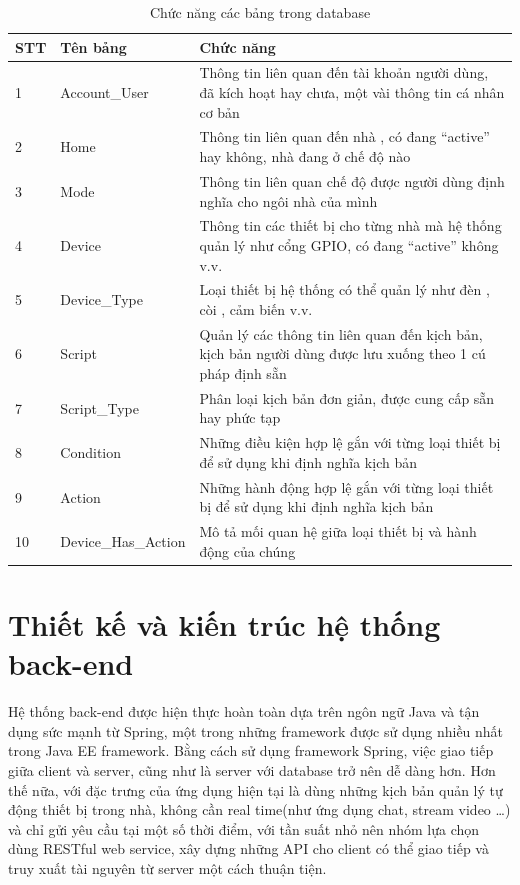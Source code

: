 \documentclass[11pt,a4paper,oneside]{book}
\begin{document}
\begin{table}
\centering
\caption{Chức năng các bảng trong database}\label{tab:db-tables}
\begin{tabular}{ |l|l|p{10cm}| } 
 \hline
	STT &	Tên bảng &	Chức năng\\ \hline
	1 &	Account\_User &	Thông tin liên quan đến tài khoản người dùng, đã kích hoạt hay chưa, một vài thông tin cá nhân cơ bản\\ \hline
	2 &	Home &	Thông tin liên quan đến nhà , có đang “active” hay không, nhà đang ở chế độ nào\\ \hline
	3 &	Mode &	Thông tin liên quan chế độ được người dùng định nghĩa cho ngôi nhà của mình\\ \hline
	4 &	Device &	Thông tin các thiết bị cho từng nhà  mà hệ thống quản lý như cổng GPIO, có đang “active” không v.v.\\ \hline
	5 &	Device\_Type &	Loại thiết bị hệ thống có thể quản lý như đèn , còi , cảm biến v.v.\\ \hline
	6 &	Script &	Quản lý các thông tin liên quan đến kịch bản, kịch bản người dùng được lưu xuống theo 1 cú pháp định sẵn\\ \hline
	7 &	Script\_Type &	Phân loại kịch bản đơn giản, được cung cấp sẵn hay phức tạp\\ \hline
	8 &	Condition &	Những điều kiện hợp lệ gắn với từng loại thiết bị để sử dụng khi định nghĩa kịch bản\\ \hline
	9 &	Action &	Những hành động hợp lệ gắn với từng loại thiết bị để sử dụng khi định nghĩa kịch bản\\ \hline
	10 &	Device\_Has\_Action &	Mô tả mối quan hệ giữa loại thiết bị và hành động của chúng\\
 \hline
\end{tabular}
\end{table}

\section{Thiết kế và kiến trúc hệ thống back-end}

Hệ thống back-end được hiện thực hoàn toàn dựa trên ngôn ngữ Java và tận dụng sức mạnh từ Spring, một trong những framework được sử dụng nhiều nhất trong Java EE framework. Bằng cách sử dụng framework Spring, việc giao tiếp giữa client và server, cũng như là server với database trở nên dễ dàng hơn. Hơn thế nữa, với đặc trưng của ứng dụng hiện tại là dùng những kịch bản quản lý tự động thiết bị trong nhà, không cần real time(như ứng dụng chat, stream video …) và chỉ gửi yêu cầu tại một số thời điểm, với tần suất nhỏ nên nhóm lựa chọn dùng RESTful web service, xây dựng những API cho client có thể giao tiếp và truy xuất tài nguyên từ server một cách thuận tiện.
\end{document}
